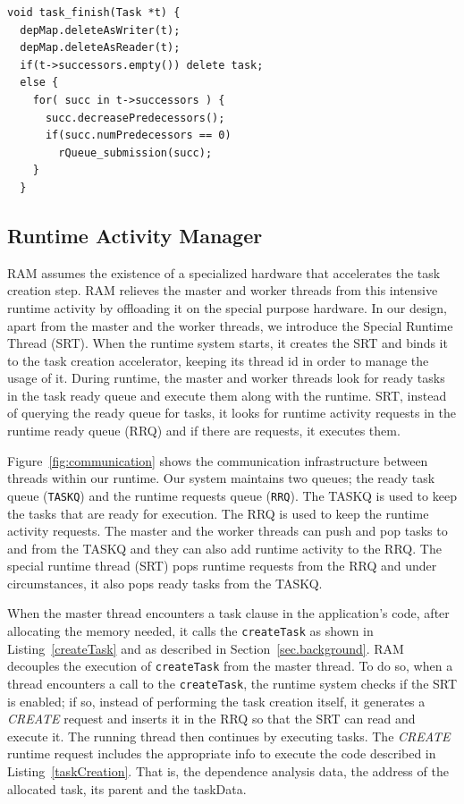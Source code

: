 \begin{lstlisting}[float, emph={void,if,return,not,true,and,break}, captionpos=b, caption={Pseudo-code for task$\_$finish runtime activity.},label=taskFinish, emph={[2]mat}, emphstyle={[2]}, aboveskip={0\baselineskip}, frame=tb, belowskip={0\baselineskip}]
void task_finish(Task *t) {
  depMap.deleteAsWriter(t);
  depMap.deleteAsReader(t);
  if(t->successors.empty()) delete task;
  else {
    for( succ in t->successors ) {
      succ.decreasePredecessors();
      if(succ.numPredecessors == 0) 
        rQueue_submission(succ);
    }
  }
\end{lstlisting}

\subsection{Runtime Activity Manager}
RAM assumes the existence of a specialized hardware that accelerates the task creation step.
RAM relieves the master and worker threads from this intensive runtime activity by offloading it on the special purpose hardware.
In our design, apart from the master and the worker threads, we introduce the Special Runtime Thread (SRT). 
When the runtime system starts, it creates the SRT and binds it to the task creation accelerator, keeping its thread id in order to manage the usage of it.
During runtime, the master and worker threads look for ready tasks in the task ready queue and execute them along with the runtime.
SRT, instead of querying the ready queue for tasks, it looks for runtime activity requests in the runtime ready queue (RRQ) and if there are requests, it executes them.

Figure~\ref{fig:communication} shows the communication infrastructure between threads within our runtime.
Our system maintains two queues; the ready task queue (\texttt{TASKQ}) and the runtime requests queue (\texttt{RRQ}).
The TASKQ is used to keep the tasks that are ready for execution. 
The RRQ is used to keep the runtime activity requests. 
The master and the worker threads can push and pop tasks to and from the TASKQ and they can also add runtime activity to the RRQ. 
The special runtime thread (SRT) pops runtime requests from the RRQ and under circumstances, it also pops ready tasks from the TASKQ.

When the master thread encounters a task clause in the application's code, after allocating the memory needed, it calls the \texttt{createTask} as shown in Listing~\ref{createTask} and as described in Section~\ref{sec.background}. 
RAM decouples the execution of \texttt{createTask} from the master thread. To do so, when a thread encounters a call to the \texttt{createTask}, the runtime system checks if the SRT is enabled; if so, instead of performing the task creation itself, it generates a \textit{CREATE} request and inserts it in the RRQ so that the SRT can read and execute it. The running thread then continues by executing tasks. 
The \textit{CREATE} runtime request includes the appropriate info to execute the code described in Listing~\ref{taskCreation}.
That is, the dependence analysis data, the address of the allocated task, its parent and the taskData.

